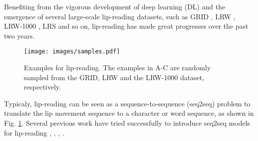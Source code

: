 \documentclass[a4paper, 10pt, conference]{ieeeconf}      %
\begin{document}
	Benefiting from the vigorous development of deep learning (DL) and the emergence of several large-scale lip-reading datasets, such as GRID \cite{cooke2006}, LRW \cite{B2017}, LRW-1000 \cite{Yang2019}, LRS \cite{Chung} and so on, lip-reading has made great progresses over the past two years.
	\begin{figure}
		\setlength{\abovecaptionskip}{0.05cm}
		\setlength{\belowcaptionskip}{-0.4cm} 
		\centering
		\texttt{[image: images/samples.pdf]}
		\caption{Examples for lip-reading. The examples in A-C are randomly sampled from the GRID, LRW and the LRW-1000 dataset, respectively.}
		\label{samples}
		\vspace{-0.5em}
	\end{figure}
	Typicaly, lip-reading can be seen as a sequence-to-sequence (seq2seq) problem to translate the lip movement sequence to a character or word sequence, as shown in Fig. \ref{samples}. Several previous work have tried successfully to introduce seq2seq models for lip-reading \cite{Afouras2018}, \cite{Chung}, \cite{Afouras2017}, \cite{Chung2017}. %
\end{document}

